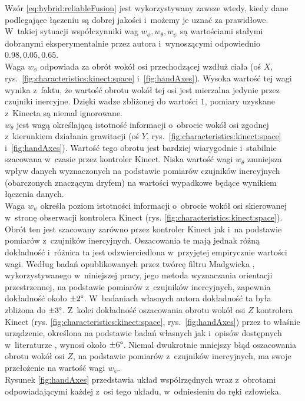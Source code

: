 Wzór \ref{eq:hybrid:reliableFusion} jest wykorzystywany zawsze wtedy, kiedy dane podlegające łączeniu są dobrej jakości i~możemy je uznać za prawidłowe. W~takiej sytuacji współczynniki wag $w_\phi , w_\theta , w_\psi$ są wartościami stałymi dobranymi eksperymentalnie przez autora i~wynoszącymi odpowiednio $0.98,0.05,0.65$.\\
Waga $w_\phi$ odpowiada za obrót wokół osi przechodzącej wzdłuż ciała (oś $X$, rys.~\ref{fig:characteristics:kinect:space} i~\ref{fig:handAxes}). Wysoka wartość tej wagi wynika z~faktu, że wartość obrotu wokół tej osi jest mierzalna jedynie przez czujniki inercyjne. Dzięki wadze zbliżonej do wartości $1$, pomiary uzyskane z~Kinecta są niemal ignorowane.\\
$w_\theta$ jest wagą określającą istotność informacji o~obrocie wokół osi zgodnej z~kierunkiem działania grawitacji (oś $Y$, rys.~\ref{fig:characteristics:kinect:space} i~\ref{fig:handAxes}). Wartość tego obrotu jest bardziej wiarygodnie i~stabilnie szacowana w~czasie przez kontroler Kinect. Niska wartość wagi $w_\theta$ zmniejsza wpływ danych wyznaczonych na podstawie pomiarów czujników inercyjnych (obarczonych znaczącym dryfem) na wartości wypadkowe będące wynikiem łączenia danych.\\ 
Waga $w_\psi$ określa poziom istotności informacji o~obrocie wokół osi skierowanej w~stronę obserwacji kontrolera Kinect (rys. \ref{fig:characteristics:kinect:space}). Obrót ten jest szacowany zarówno przez kontroler Kinect jak i~na podstawie pomiarów z~czujników inercyjnych. Oszacowania te mają jednak różną dokładność i~różnica ta jest odzwierciedlona w~przyjętej empirycznie wartości wagi. Według badań opublikowanych przez twórcę filtru Madgwicka \cite{Madgwick2010}, wykorzystywanego w~niniejszej pracy, jego metoda wyznaczania orientacji przestrzennej, na podstawie pomiarów z~czujników inercyjnych, zapewnia dokładność około $\pm2\degree$. W~badaniach własnych autora dokładność ta była zbliżona do $\pm3\degree$. Z~kolei dokładność oszacowania obrotu wokół osi $Z$ kontrolera Kinect (rys. \ref{fig:characteristics:kinect:space}, rys.~\ref{fig:handAxes}) przez to właśnie urządzenie, określona na podstawie badań własnych jak i~opisów dostępnych w~literaturze \cite{Huber2015}, wynosi około $\pm6\degree$. Niemal dwukrotnie mniejszy błąd oszacowania obrotu wokół osi $Z$, na podstawie pomiarów z~czujników inercyjnych, ma swoje przełożenie na wartość wagi $w_\psi$.\\
Rysunek \ref{fig:handAxes} przedstawia układ współrzędnych wraz z~obrotami odpowiadającymi każdej z~osi tego układu, w~odniesieniu do ręki człowieka.
										
